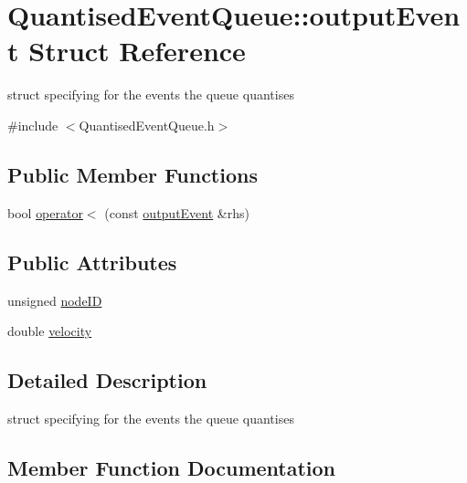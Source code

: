 \hypertarget{structQuantisedEventQueue_1_1outputEvent}{}\section{Quantised\+Event\+Queue\+:\+:output\+Event Struct Reference}
\label{structQuantisedEventQueue_1_1outputEvent}


struct specifying for the events the queue quantises  




{\ttfamily \#include $<$Quantised\+Event\+Queue.\+h$>$}

\subsection*{Public Member Functions}
\begin{DoxyCompactItemize}
\item 
bool \hyperlink{structQuantisedEventQueue_1_1outputEvent_af78529e507856f3e6187d063ead41320}{operator$<$} (const \hyperlink{structQuantisedEventQueue_1_1outputEvent}{output\+Event} \&rhs)
\end{DoxyCompactItemize}
\subsection*{Public Attributes}
\begin{DoxyCompactItemize}
\item 
unsigned \hyperlink{structQuantisedEventQueue_1_1outputEvent_a217eea923c7d29c3818a078ad49523f1}{node\+ID}
\item 
double \hyperlink{structQuantisedEventQueue_1_1outputEvent_abcec0dd63fe3d2a68f070a7518096e39}{velocity}
\end{DoxyCompactItemize}


\subsection{Detailed Description}
struct specifying for the events the queue quantises 

\subsection{Member Function Documentation}
